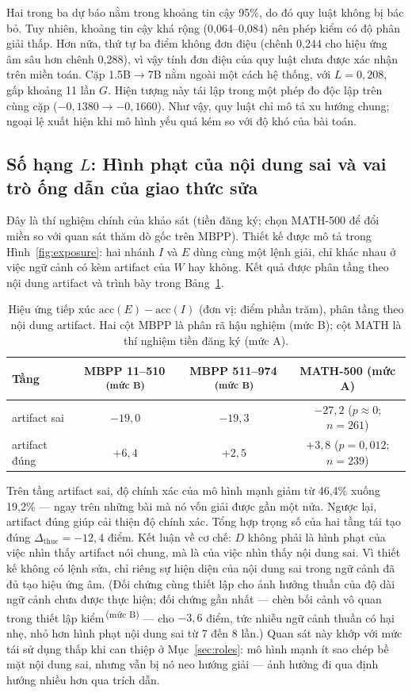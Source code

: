 \documentclass[12pt,a4paper]{article}
\newcommand{\mucB}{\textsuperscript{\,(mức B)}}
\newcommand{\dhonest}{\Delta_{\mathrm{thuc}}}
\newcommand{\acc}{\mathrm{acc}}
\begin{document}
Hai trong ba dự báo nằm trong khoảng tin cậy 95\%, do đó quy luật không bị bác bỏ. Tuy nhiên, khoảng tin cậy khá rộng (0,064--0,084) nên phép kiểm có độ phân giải thấp. Hơn nữa, thứ tự ba điểm không đơn điệu (chênh 0,244 cho hiệu ứng âm sâu hơn chênh 0,288), vì vậy tính đơn điệu của quy luật chưa được xác nhận trên miền toán. Cặp 1.5B\(\to\)7B nằm ngoài một cách hệ thống, với \(L = 0{,}208\), gấp khoảng 11 lần \(G\). Hiện tượng này tái lập trong một phép đo độc lập trên cùng cặp (\(-0{,}1380 \to -0{,}1660\)). Như vậy, quy luật chỉ mô tả xu hướng chung; ngoại lệ xuất hiện khi mô hình yếu quá kém so với độ khó của bài toán.

\subsection{Số hạng \(L\): Hình phạt của nội dung sai và vai trò ống dẫn của giao thức sửa}\label{sec:termL}

Đây là thí nghiệm chính của khảo sát (tiền đăng ký; chọn MATH-500 để đổi miền so với quan sát thăm dò gốc trên MBPP). Thiết kế được mô tả trong Hình~\ref{fig:exposure}: hai nhánh \(I\) và \(E\) dùng cùng một lệnh giải, chỉ khác nhau ở việc ngữ cảnh có kèm artifact của \(W\) hay không. Kết quả được phân tầng theo nội dung artifact và trình bày trong Bảng~\ref{tab:exposure}.

\begin{table}[htbp]
\centering
\small
\begin{tabular}{@{}l c c c@{}}
\toprule
Tầng & MBPP 11--510\mucB & MBPP 511--974\mucB & MATH-500 (mức A)\\
\midrule
artifact sai  & \(-19{,}0\) & \(-19{,}3\) & \(-27{,}2\) (\(p\approx 0\); \(n=261\))\\
artifact đúng & \(+6{,}4\) & \(+2{,}5\) & \(+3{,}8\) (\(p=0{,}012\); \(n=239\))\\
\bottomrule
\end{tabular}
\caption{Hiệu ứng tiếp xúc \(\acc(E)-\acc(I)\) (đơn vị: điểm phần trăm), phân tầng theo nội dung artifact. Hai cột MBPP là phân rã hậu nghiệm (mức B); cột MATH là thí nghiệm tiền đăng ký (mức A).}
\label{tab:exposure}
\end{table}

Trên tầng artifact sai, độ chính xác của mô hình mạnh giảm từ 46,4\% xuống 19,2\% --- ngay trên những bài mà nó vốn giải được gần một nửa. Ngược lại, artifact đúng giúp cải thiện độ chính xác. Tổng hợp trọng số của hai tầng tái tạo đúng \(\dhonest = -12{,}4\) điểm. Kết luận về cơ chế: \(D\) không phải là hình phạt của việc nhìn thấy artifact nói chung, mà là của việc nhìn thấy nội dung sai. Vì thiết kế không có lệnh sửa, chỉ riêng sự hiện diện của nội dung sai trong ngữ cảnh đã đủ tạo hiệu ứng âm. (Đối chứng cùng thiết lập cho ảnh hưởng thuần của độ dài ngữ cảnh chưa được thực hiện; đối chứng gần nhất --- chèn bối cảnh vô quan trong thiết lập kiểm\mucB{} --- cho \(-3{,}6\) điểm, tức nhiễu ngữ cảnh thuần có hại nhẹ, nhỏ hơn hình phạt nội dung sai từ 7 đến 8 lần.) Quan sát này khớp với mức tái sử dụng thấp khi can thiệp ở Mục~\ref{sec:roles}: mô hình mạnh ít sao chép bề mặt nội dung sai, nhưng vẫn bị nó neo hướng giải --- ảnh hưởng đi qua định hướng nhiều hơn qua trích dẫn.
\end{document}
